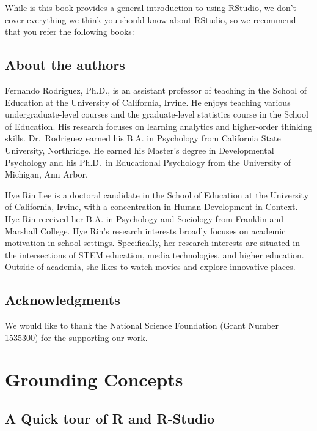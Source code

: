 \documentclass[
]{book}
\begin{document}
While is this book provides a general introduction to using RStudio, we don't cover everything we think you should know about RStudio, so we recommend that you refer the following books:

\hypertarget{about-the-authors}{%
\section{About the authors}\label{about-the-authors}}

Fernando Rodriguez, Ph.D., is an assistant professor of teaching in the School of Education at the University of California, Irvine. He enjoys teaching various undergraduate-level courses and the graduate-level statistics course in the School of Education. His research focuses on learning analytics and higher-order thinking skills. Dr.~Rodriguez earned his B.A. in Psychology from California State University, Northridge. He earned his Master's degree in Developmental Psychology and his Ph.D.~in Educational Psychology from the University of Michigan, Ann Arbor.

Hye Rin Lee is a doctoral candidate in the School of Education at the University of California, Irvine, with a concentration in Human Development in Context. Hye Rin received her B.A. in Psychology and Sociology from Franklin and Marshall College. Hye Rin's research interests broadly focuses on academic motivation in school settings. Specifically, her research interests are situated in the intersections of STEM education, media technologies, and higher education. Outside of academia, she likes to watch movies and explore innovative places.

\hypertarget{acknowledgments}{%
\section{Acknowledgments}\label{acknowledgments}}

We would like to thank the National Science Foundation (Grant Number 1535300) for the supporting our work.

\hypertarget{grounding-concepts}{%
\chapter{Grounding Concepts}\label{grounding-concepts}}

\hypertarget{a-quick-tour-of-r-and-r-studio}{%
\section{A Quick tour of R and R-Studio}\label{a-quick-tour-of-r-and-r-studio}}
\end{document}
